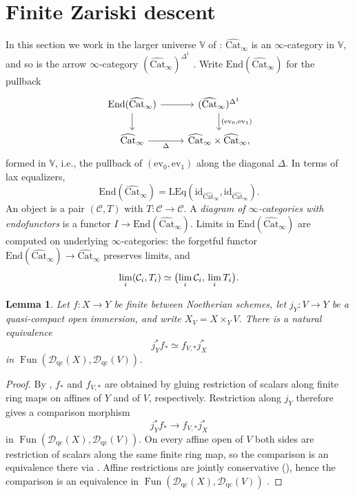 \documentclass[11pt]{amsart}
\newcommand{\cC}{\mathcal{C}}
\renewcommand{\lim}{\operatornamewithlimits{\rm{lim}}}
\DeclareMathOperator{\Fun}{\mathrm{Fun}}
\newcommand{\LEq}{\mathrm{LEq}}
\newcommand{\ev}{\mathrm{ev}}
\newcommand{\Catbig}{\widehat{\mathrm{Cat}}}
\newcommand{\Dqc}{\mathcal D_{\mathrm{qc}}}
\theoremstyle{plain}
\newtheorem{lemma}[lemma]{Lemma}
\theoremstyle{definition}
\numberwithin{equation}{section}
\begin{document}
\section{Finite Zariski descent}\label{sec:descent}
In this section we work in the larger universe $\mathbb V$ of : $\Catbig_\infty$ is an $\infty$-category in $\mathbb V$, and so is the arrow $\infty$-category $(\Catbig_\infty)^{\Delta^1}$ \cite[\href{https://kerodon.net/tag/0066}{Tag 0066}]{Kerodon}.
Write $\mathrm{End}(\Catbig_\infty)$ for the pullback
\[
\begin{tikzcd}
 \mathrm{End}(\Catbig_\infty)\ar[r]\ar[d] &
 (\Catbig_\infty)^{\Delta^1}\ar[d,"{(\ev_0,\ev_1)}"]\\
 \Catbig_\infty\ar[r,"{\Delta}"']&
 \Catbig_\infty\times\Catbig_\infty,
\end{tikzcd}
\]
formed in $\mathbb V$, i.e., the pullback of $(\ev_0,\ev_1)$ along the diagonal $\Delta$.
In terms of lax equalizers,
\[
 \mathrm{End}(\Catbig_\infty)=\LEq(\mathrm{id}_{\Catbig_\infty},\mathrm{id}_{\Catbig_\infty}).
\]
An object is a pair $(\cC,T)$ with $T:\cC\to\cC$.
A \emph{diagram of $\infty$-categories with endofunctors} is a functor $I\to\mathrm{End}(\Catbig_\infty)$.
Limits in $\mathrm{End}(\Catbig_\infty)$ are computed on underlying $\infty$-categories: the forgetful functor $\mathrm{End}(\Catbig_\infty)\to\Catbig_\infty$ preserves limits, and
\[
 \lim_i(\cC_i,T_i)\simeq\bigl(\lim_i\cC_i,\,\lim_i T_i\bigr).
\]

\begin{lemma}\label{lem:open-push}
Let $f:X\to Y$ be finite between Noetherian schemes, let $j_Y:V\to Y$ be a quasi-compact open immersion, and write $X_V=X\times_Y V$.
There is a natural equivalence
\[
 j_Y^*f_*\simeq f_{V,*}j_X^*
\]
in $\Fun(\Dqc(X),\Dqc(V))$.
\end{lemma}
\begin{proof}
By , $f_*$ and $f_{V,*}$ are obtained by gluing restriction of scalars along finite ring maps on affines of $Y$ and of $V$, respectively.
Restriction along $j_Y$ therefore gives a comparison morphism
\[
 j_Y^*f_*\to f_{V,*}j_X^*
\]
in $\Fun(\Dqc(X),\Dqc(V))$.
On every affine open of $V$ both sides are restriction of scalars along the same finite ring map, so the comparison is an equivalence there via .
Affine restrictions are jointly conservative (), hence the comparison is an equivalence in $\Fun(\Dqc(X),\Dqc(V))$ \cite[\href{https://kerodon.net/tag/01DK}{Tag 01DK}]{Kerodon}.
\end{proof}
\end{document}
